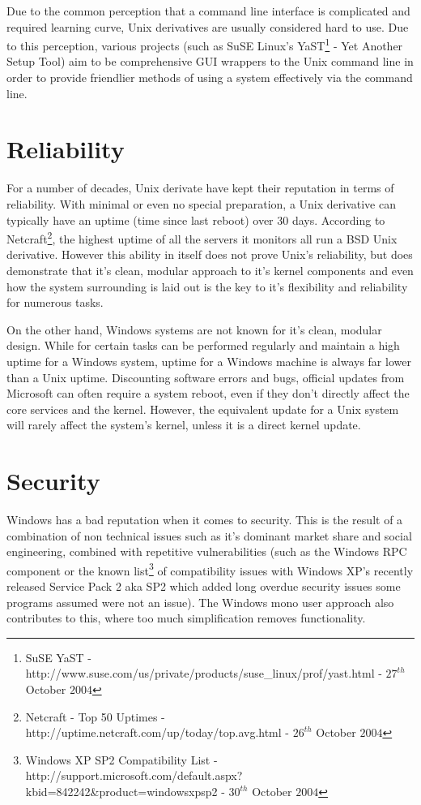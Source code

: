 \documentclass[a4paper,12pt]{article}
\begin{document}
Due to the common perception that a command line interface is
complicated and required learning curve, Unix derivatives are usually
considered hard to use. Due to this perception, various projects
(such as SuSE Linux's YaST\footnote{SuSE YaST -
http://www.suse.com/us/private/products/suse\_linux/prof/yast.html - 
$27^{th}$ October $2004$} - Yet Another Setup Tool) aim to be
comprehensive GUI wrappers to the Unix command line in order to provide
friendlier methods of using a system effectively via the command line.

\section*{Reliability}

For a number of decades, Unix derivate have kept their reputation in
terms of reliability. With minimal or even no special preparation, a
Unix derivative can typically have an uptime (time since last reboot) 
over 30 days. According to Netcraft\footnote{Netcraft - Top 50 Uptimes 
-  http://uptime.netcraft.com/up/today/top.avg.html - $26^{th}$ October
$2004$}, the highest uptime of all the servers it monitors all run a BSD
Unix derivative. However this ability in itself does not prove Unix's
reliability, but does demonstrate that it's clean, modular approach to 
it's kernel components and even how the system surrounding is laid out 
is the key to it's flexibility and reliability for numerous tasks.

On the other hand, Windows systems are not known for it's clean, modular
design. While for certain tasks can be performed regularly and maintain
a high uptime for a Windows system, uptime for a Windows machine is
always far lower than a Unix uptime. Discounting software errors and
bugs, official updates from Microsoft can often require a system reboot,
even if they don't directly affect the core services and the kernel.
However, the equivalent update for a Unix system will rarely affect the
system's kernel, unless it is a direct kernel update.

\section*{Security}

Windows has a bad reputation when it comes to security. This is the
result of a combination of non technical issues such as it's dominant 
market share and social engineering, combined with repetitive vulnerabilities 
(such as the Windows RPC component or the known 
list\footnote{Windows XP SP2 Compatibility List -
http://support.microsoft.com/default.aspx?kbid=842242\&product=windowsxpsp2
- $30^{th}$ October $2004$} of compatibility issues with Windows XP's
recently released Service Pack 2 aka SP2 which added long overdue security issues
some programs assumed were not an issue). The Windows mono user approach
also contributes to this, where too much simplification removes
functionality.
\end{document}
